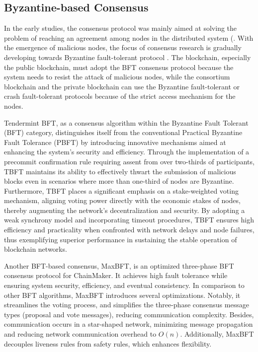 \subsection{Byzantine-based Consensus}

In the early studies, the consensus protocol was mainly aimed at solving the problem of reaching an agreement among nodes in the distributed system (\cite{lamport1982byzantine,fischer1985impossibility,biely2011synchronous}. 
With the emergence of malicious nodes, the focus of consensus research is gradually developing towards Byzantine fault-tolerant protocol
\cite{castro1999practical,castro2022practical,cachin2001secure}. 
The blockchain, especially the public blockchain, must adopt the BFT consensus protocol because the system needs to resist the attack of malicious nodes, while the consortium blockchain and the private
blockchain can use the Byzantine fault-tolerant or crash fault-tolerant protocols because of the strict access mechanism for the nodes.


Tendermint BFT, as a consensus algorithm within the Byzantine Fault Tolerant (BFT) category, distinguishes itself from the conventional Practical Byzantine Fault Tolerance (PBFT) by introducing innovative mechanisms aimed at enhancing the system's security and efficiency. Through the implementation of a precommit confirmation rule requiring assent from over two-thirds of participants, TBFT maintains its ability to effectively thwart the submission of malicious blocks even in scenarios where more than one-third of nodes are Byzantine. Furthermore, TBFT places a significant emphasis on a stake-weighted voting mechanism, aligning voting power directly with the economic stakes of nodes, thereby augmenting the network's decentralization and security. By adopting a weak synchrony model and incorporating timeout procedures, TBFT ensures high efficiency and practicality when confronted with network delays and node failures, thus exemplifying superior performance in sustaining the stable operation of blockchain networks.\cite{buchman2016tendermint}

Another BFT-based consensus, MaxBFT,  is an optimized three-phase BFT consensus protocol for ChainMaker. It achieves high fault tolerance while ensuring system security, efficiency, and eventual consistency. In comparison to other BFT algorithms, MaxBFT introduces several optimizations. 
Notably, it streamlines the voting process, and simplifies the three-phase consensus message types (proposal and vote messages), reducing communication complexity. 
Besides, communication occurs in a star-shaped network, minimizing message propagation and reducing network communication overhead to \(O(n)\). 
Additionally, MaxBFT decouples liveness rules from safety rules, which enhances flexibility.\cite{yin2019hotstuff}

